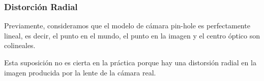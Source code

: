 \fi

\begin{frame}
	\frametitle{Distorción Radial}
	
	\footnotesize
	
	Previamente, consideramos que el modelo de cámara pin-hole es perfectamente lineal, es decir, el punto en el mundo, el punto en la imagen y el centro óptico son colineales.
	
	Esta suposición no es cierta en la práctica porque hay una distorsión radial en la imagen producida por la lente de la cámara real.
	
	\begin{figure}[!h]
		\centering
	\end{figure}
	
\end{frame}


